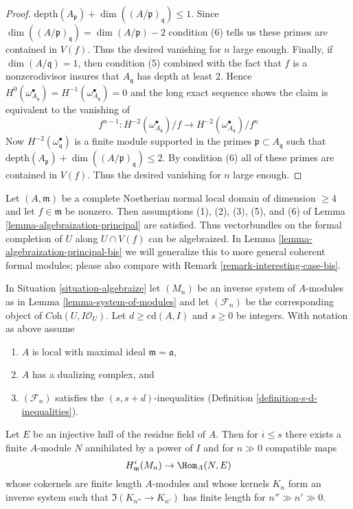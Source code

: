 \begin{proof}
$\text{depth}(A_\mathfrak p) + \dim((A/\mathfrak p)_\mathfrak q) \leq 1$.
Since $\dim((A/\mathfrak p)_\mathfrak q) = \dim(A/\mathfrak p) - 2$
condition (6) tells us these primes are contained in $V(f)$.
Thus the desired vanishing for $n$ large enough.
Finally, if $\dim(A/\mathfrak q) = 1$, then condition (5) combined
with the fact that $f$ is a nonzerodivisor
insures that $A_\mathfrak q$ has depth at least $2$. Hence
$H^0(\omega_{A_\mathfrak q}^\bullet) =
H^{-1}(\omega_{A_\mathfrak q}^\bullet) = 0$
and the long exact sequence shows the claim is
equivalent to the vanishing of
$$
f^{n - 1} :
H^{-2}(\omega_{A_\mathfrak q}^\bullet)/f \to
H^{-2}(\omega_{A_\mathfrak q}^\bullet)/f^n
$$
Now $H^{-2}(\omega^\bullet_\mathfrak q)$ is a finite
module supported in the primes $\mathfrak p \subset A_\mathfrak q$
such that $\text{depth}(A_\mathfrak p) + \dim((A/\mathfrak p)_\mathfrak q)
\leq 2$. By condition (6) all of these primes are contained in $V(f)$.
Thus the desired vanishing for $n$ large enough.
\end{proof}

\begin{remark}
\label{remark-interesting-case}
Let $(A, \mathfrak m)$ be a complete Noetherian normal local domain
of dimension $\geq 4$ and let $f \in \mathfrak m$ be nonzero.
Then assumptions (1), (2), (3), (5), and (6) of
Lemma \ref{lemma-algebraization-principal}
are satisfied. Thus vectorbundles
on the formal completion of $U$ along $U \cap V(f)$
can be algebraized. In Lemma \ref{lemma-algebraization-principal-bis}
we will generalize this to more general coherent formal modules;
please also compare with Remark \ref{remark-interesting-case-bis}.
\end{remark}

\begin{lemma}
\label{lemma-helper-algebraize}
In Situation \ref{situation-algebraize} let $(M_n)$ be an inverse system of
$A$-modules as in Lemma \ref{lemma-system-of-modules} and let
$(\mathcal{F}_n)$ be the corresponding object of
$\textit{Coh}(U, I\mathcal{O}_U)$. Let $d \geq \text{cd}(A, I)$
and $s \geq 0$ be integers.
With notation as above assume
\begin{enumerate}
\item $A$ is local with maximal ideal $\mathfrak m = \mathfrak a$,
\item $A$ has a dualizing complex, and
\item $(\mathcal{F}_n)$ satisfies the $(s, s + d)$-inequalities
(Definition \ref{definition-s-d-inequalities}).
\end{enumerate}
Let $E$ be an injective hull of the residue field of $A$. Then for $i \leq s$
there exists a finite $A$-module $N$ annihilated by a power
of $I$ and for $n \gg 0$ compatible maps
$$
H^i_\mathfrak m(M_n) \to \Hom_A(N, E)
$$
whose cokernels are finite length $A$-modules and whose kernels $K_n$
form an inverse system such that $\Im(K_{n''} \to K_{n'})$ has finite
length for $n'' \gg n' \gg 0$.
\end{lemma}

